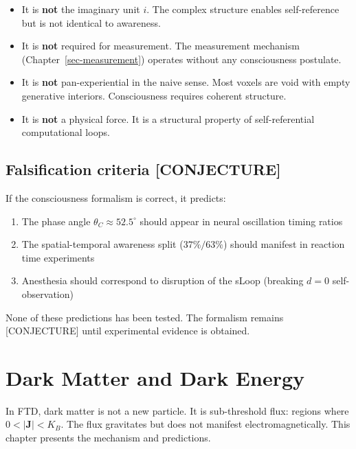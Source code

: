 \documentclass[
  11pt,
  letterpaper,
  twoside,
  openany]{book}
\makeatletter
\providecommand{\tightlist}{%
  \setlength{\itemsep}{0pt}\setlength{\parskip}{0pt}}
\let\orig@section\section
\renewcommand{\section}{\needspace{8\baselineskip}\orig@section}
\makeatother
\begin{document}
\begin{itemize}
\tightlist
\item
  It is \textbf{not} the imaginary unit \(i\). The complex structure
  enables self-reference but is not identical to awareness.
\item
  It is \textbf{not} required for measurement. The measurement mechanism
  (Chapter~\ref{sec-measurement}) operates without any consciousness
  postulate.
\item
  It is \textbf{not} pan-experiential in the naive sense. Most voxels
  are void with empty generative interiors. Consciousness requires
  coherent structure.
\item
  It is \textbf{not} a physical force. It is a structural property of
  self-referential computational loops.
\end{itemize}

\section{Falsification criteria
{[}CONJECTURE{]}}\label{falsification-criteria-conjecture}

If the consciousness formalism is correct, it predicts:

\begin{enumerate}
\def\labelenumi{\arabic{enumi}.}
\tightlist
\item
  The phase angle \(\theta_C \approx 52.5^{\circ}\) should appear in
  neural oscillation timing ratios
\item
  The spatial-temporal awareness split (\(37\%/63\%\)) should manifest
  in reaction time experiments
\item
  Anesthesia should correspond to disruption of the sLoop (breaking
  \(d = 0\) self-observation)
\end{enumerate}

None of these predictions has been tested. The formalism remains
{[}CONJECTURE{]} until experimental evidence is obtained.

\chapter{Dark Matter and Dark Energy}\label{sec-dark}

In FTD, dark matter is not a new particle. It is sub-threshold flux:
regions where \(0 < |\mathbf{J}| < K_B\). The flux gravitates but does
not manifest electromagnetically. This chapter presents the mechanism
and predictions.
\end{document}
